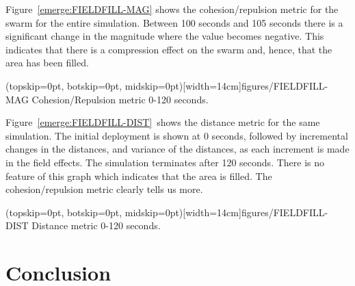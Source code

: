 \documentclass{ieeeaccess}
\begin{document}
Figure~\ref{emerge:FIELDFILL-MAG} shows the cohesion/repulsion metric for the
swarm for the entire simulation. Between 100 seconds and 105 seconds there is a
significant change in the magnitude where the value becomes negative. This
indicates that there is a compression effect on the swarm and, hence, that the
area has been filled.

\Figure[t!](topskip=0pt, botskip=0pt,
midskip=0pt)[width=14cm]{figures/FIELDFILL-MAG} {Cohesion/Repulsion metric
0-120 seconds.\label{emerge:FIELDFILL-MAG}}


Figure~\ref{emerge:FIELDFILL-DIST}~shows the distance metric for the same
simulation. The initial deployment is shown at 0 seconds, followed by
incremental changes in the distances, and variance of the distances, as each
increment is made in the field effects. The simulation terminates after 120
seconds. There is no feature of this graph which indicates that the area is
filled. The cohesion/repulsion metric clearly tells us more. 

\Figure[t!](topskip=0pt, botskip=0pt,
midskip=0pt)[width=14cm]{figures/FIELDFILL-DIST} {Distance metric 0-120
seconds.\label{emerge:FIELDFILL-DIST}}


\section{Conclusion}\label{Section:MagnitudeDistanceComparison}
\end{document}
